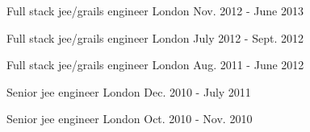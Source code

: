 \begin{cventries}
  \cventry
    {Full stack jee/grails engineer} %
    {} %
    {London} %
    {Nov. 2012 - June 2013} %
    {}
    {}

  \cventry
    {Full stack jee/grails engineer} %
    {} %
    {London} %
    {July 2012 - Sept. 2012} %
    {}
    {}

  \cventry
    {Full stack jee/grails engineer} %
    {} %
    {London} %
    {Aug. 2011 - June 2012} %
    {}
    {}

  \cventry
    {Senior jee engineer} %
    {} %
    {London} %
    {Dec. 2010 - July 2011} %
    {}
    {}

  \cventry
    {Senior jee engineer} %
    {} %
    {London} %
    {Oct. 2010 - Nov. 2010} %
    {}
    {}
\end{cventries}



